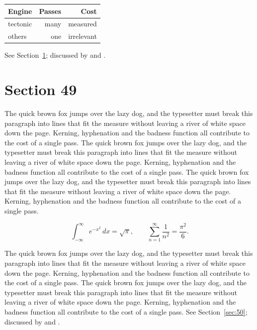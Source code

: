 \documentclass{article}
\begin{document}
\begin{center}
\begin{tabular}{lrr}
\toprule
Engine & Passes & Cost \\
\midrule
tectonic & many & measured \\
others & one & irrelevant \\
\bottomrule
\end{tabular}
\end{center}

See Section~\ref{sec:49}; discussed by \textcite{k4} and \textcite{l1}.
\section{Section 49}
\label{sec:49}
The quick brown fox jumps over the lazy dog, and the typesetter must break this paragraph into lines that fit the measure without leaving a river of white space down the page. Kerning, hyphenation and the badness function all contribute to the cost of a single pass. The quick brown fox jumps over the lazy dog, and the typesetter must break this paragraph into lines that fit the measure without leaving a river of white space down the page. Kerning, hyphenation and the badness function all contribute to the cost of a single pass. The quick brown fox jumps over the lazy dog, and the typesetter must break this paragraph into lines that fit the measure without leaving a river of white space down the page. Kerning, hyphenation and the badness function all contribute to the cost of a single pass. 

\begin{equation}\label{eq:49}
\int_{-\infty}^{\infty} e^{-x^{2}}\,dx = \sqrt{\pi}, \qquad
\sum_{n=1}^{\infty} \frac{1}{n^{2}} = \frac{\pi^{2}}{6}.
\end{equation}

The quick brown fox jumps over the lazy dog, and the typesetter must break this paragraph into lines that fit the measure without leaving a river of white space down the page. Kerning, hyphenation and the badness function all contribute to the cost of a single pass. The quick brown fox jumps over the lazy dog, and the typesetter must break this paragraph into lines that fit the measure without leaving a river of white space down the page. Kerning, hyphenation and the badness function all contribute to the cost of a single pass. 
See Section~\ref{sec:50}; discussed by \textcite{k5} and \textcite{l2}.
\end{document}
